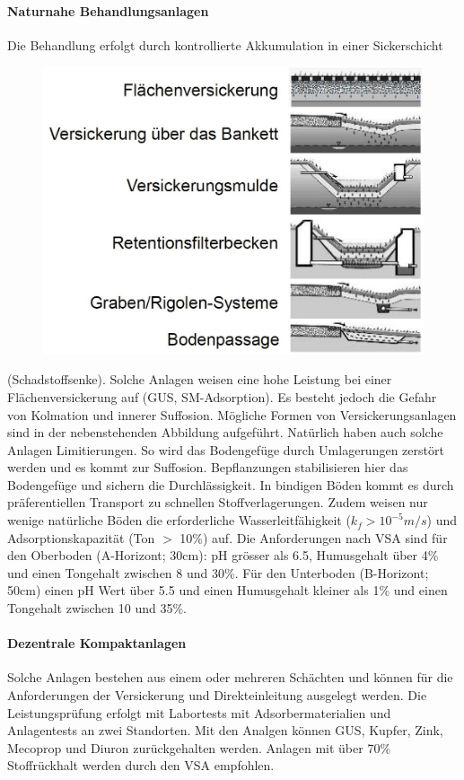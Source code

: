 \documentclass[9pt, openright=false]{scrartcl}
\begin{document}
\paragraph{Naturnahe Behandlungsanlagen} Die Behandlung erfolgt durch  kontrollierte Akkumulation in einer Sickerschicht\begin{figure} 
  \includegraphics[width=.45\textwidth]{images/versickerungsanlagen}
\end{figure} (Schadstoffsenke). Solche Anlagen weisen eine hohe Leistung bei einer Flächenversickerung auf (GUS, SM-Adsorption). Es besteht jedoch die Gefahr von Kolmation und innerer Suffosion. Mögliche Formen von Versickerungsanlagen sind in der nebenstehenden Abbildung aufgeführt. Natürlich haben auch solche Anlagen Limitierungen. So wird das Bodengefüge durch Umlagerungen zerstört werden und es kommt zur Suffosion. Bepflanzungen stabilisieren hier das Bodengefüge und sichern die Durchlässigkeit. In bindigen Böden kommt es durch präferentiellen Transport zu schnellen Stoffverlagerungen. Zudem weisen nur wenige natürliche Böden die erforderliche Wasserleitfähigkeit ($k_f > 10^{-5} m/s$) und Adsorptionskapazität (Ton $>$ 10\%) auf. Die Anforderungen nach VSA sind für den Oberboden (A-Horizont; 30cm): pH grösser als 6.5, Humusgehalt über 4\% und einen Tongehalt zwischen 8 und 30\%. Für den Unterboden (B-Horizont; 50cm) einen pH Wert über 5.5 und einen Humusgehalt kleiner als 1\% und einen Tongehalt zwischen 10 und 35\%. 
\paragraph{Dezentrale Kompaktanlagen} Solche Anlagen bestehen aus einem oder mehreren Schächten und können für die Anforderungen der Versickerung und Direkteinleitung ausgelegt werden. Die Leistungsprüfung erfolgt mit Labortests mit Adsorbermaterialien und Anlagentests an zwei Standorten. Mit den Analgen können GUS, Kupfer, Zink, Mecoprop und Diuron zurückgehalten werden. Anlagen mit über 70\% Stoffrückhalt werden durch den VSA empfohlen.
\end{document}
